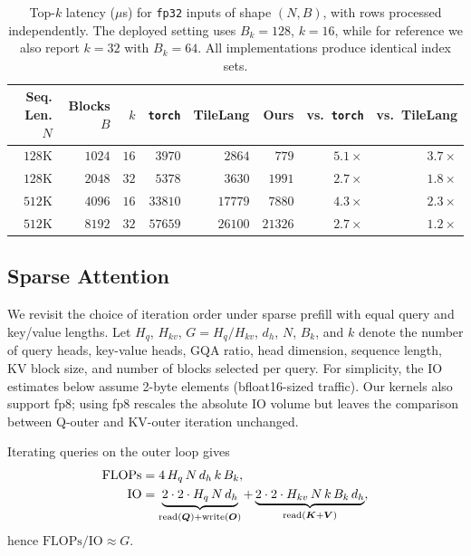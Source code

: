 \begin{table}[h]
\centering
\begin{tabular}{rrrrrrrr}
\toprule
Seq. Len. $N$ & Blocks $B$ & $k$ & \texttt{torch} & TileLang & Ours & vs.\ \texttt{torch} & vs.\ TileLang \\
\midrule
$128$K & $1024$ & $16$ & $3970$  & $2864$  & $779$   & $5.1\times$ & $3.7\times$ \\
$128$K & $2048$ & $32$ & $5378$  & $3630$  & $1991$  & $2.7\times$ & $1.8\times$ \\
$512$K & $4096$ & $16$ & $33810$ & $17779$ & $7880$  & $4.3\times$ & $2.3\times$ \\
$512$K & $8192$ & $32$ & $57659$ & $26100$ & $21326$ & $2.7\times$ & $1.2\times$ \\
\bottomrule
\end{tabular}
\caption{Top-$k$ latency ($\mu$s) for \texttt{fp32} inputs of shape $(N, B)$, with rows processed independently. The deployed setting uses $B_k = 128$, $k = 16$, while for reference we also report $k = 32$ with $B_k = 64$. All implementations produce identical index sets.}

\label{tab:topk_latency}
\end{table}
\FloatBarrier

\subsection{Sparse Attention}
\label{sec:kernel:sparse_attn}

We revisit the choice of iteration order under sparse prefill with equal query and key/value lengths. Let $H_q$, $H_{kv}$, $G = H_q / H_{kv}$, $d_h$, $N$, $B_k$, and $k$ denote the number of query heads, key-value heads, GQA ratio, head dimension, sequence length, KV block size, and number of blocks selected per query.  For simplicity, the IO estimates below assume 2-byte elements (bfloat16-sized traffic). Our kernels also support fp8; using fp8 rescales the absolute IO volume but leaves the comparison between Q-outer and KV-outer iteration unchanged.

Iterating queries on the outer loop gives
\begin{align}
\mathrm{FLOPs} &= 4\, H_q\, N\, d_h\, k\, B_k, \\
\mathrm{IO}    &= \underbrace{2 \cdot 2 \cdot H_q\, N\, d_h}_{\text{read}({\bm{Q}})+\text{write}({\bm{O}})}
                + \underbrace{2 \cdot 2 \cdot H_{kv}\, N\, k\, B_k\, d_h}_{\text{read}({\bm{K}}+{\bm{V}})},
\end{align}
hence $\mathrm{FLOPs}/\mathrm{IO} \approx G$.

